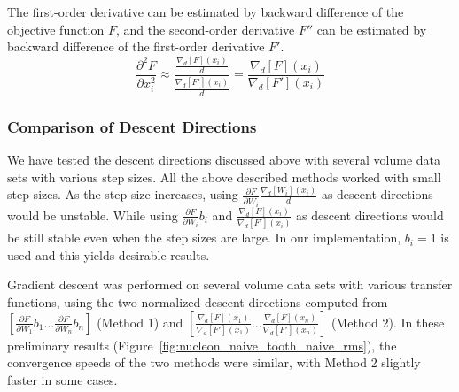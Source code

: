 The first-order derivative can be estimated by backward difference of the objective function $ F $, and the second-order derivative $ F'' $ can be estimated by backward difference of the first-order derivative $ F' $.
\[ \frac{\partial^2 F}{\partial x_{i}^2} 
\approx \dfrac{ \frac{\nabla_{d}[F](x_{i})}{d} }{ \frac{\nabla_{d}[F'](x_{i})}{d} }
= \frac{ \nabla_{d}[F](x_{i}) }{ \nabla_{d}[F'](x_{i}) } \]

\subsubsection{Comparison of Descent Directions}
We have tested the descent directions discussed above with several volume data sets with various step sizes.
All the above described methods worked with small step sizes. As the step size increases, using $ \frac{\partial F}{\partial W_{i}} \frac{\nabla_{d}[W_{i}](x_{i})}{d} $ as descent directions would be unstable. While using $ \frac{\partial F}{\partial W_{i}} b_{i} $ and $ \frac{ \nabla_{d}[F](x_{i}) }{ \nabla_{d}[F'](x_{i}) } $ as descent directions would be still stable even when the step sizes are large. In our implementation, $ b_{i}=1 $ is used and this yields desirable results.

Gradient descent was performed on several volume data sets with various transfer functions, using the two normalized descent directions computed from $ [ \frac{\partial F}{\partial W_{1}} b_{1} ... \frac{\partial F}{\partial W_{n}} b_{n} ] $ (Method 1)
 and 
$ [ \frac{ \nabla_{d}[F](x_{1}) }{ \nabla_{d}[F'](x_{1}) }  ... \frac{ \nabla_{d}[F](x_{n}) }{ \nabla_{d}[F'](x_{n}) } ] $ (Method 2).
In these preliminary results (Figure~\ref{fig:nucleon_naive_tooth_naive_rms}), the convergence speeds of the two methods were similar, with Method 2 slightly faster in some cases.

